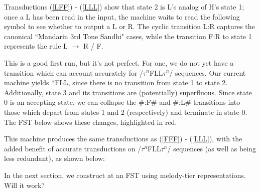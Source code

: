\documentclass{article}
\begin{document}
Transductions (\ref{LFF}) - (\ref{LLL}) show that state 2 is L's analog of H's state 1; once a L has been read in the input, the machine waits to read the following symbol to see whether to output a L or R. The cyclic transition L:R captures the canonical ``Mandarin 3rd Tone Sandhi" cases, while the transition F:R to state 1 represents the rule L $\rightarrow$ R / \underline{\hspace{1em}} F. \par
This is a good first run, but it's not perfect. For one, we do not yet have a transition which can account accurately for /$\tau^{n}$FLL$\tau^{n}$/ sequences. Our current machine yields *FLL, since there is no transition from state 1 to state 2. Additionally, state 3 and its transitions are (potentially) superfluous. Since state 0 is an accepting state, we can collapse the \#:F\# and \#:L\# transitions into those which depart from states 1 and 2 (respectively) and terminate in state 0. The FST below shows these changes, highlighted in red.  
\begin{exe}
\ex \label{FST2}
\end{exe}
This machine produces the same transductions as (\ref{FFF}) - (\ref{LLL}), with the added benefit of accurate transductions on /$\tau^{n}$FLL$\tau^{n}$/ sequences (as well as being less redundant), as shown below:
\begin{exe}
\ex 
{}
\end{exe}
In the next section, we construct at an FST using melody-tier representations. Will it work?
\end{document}
